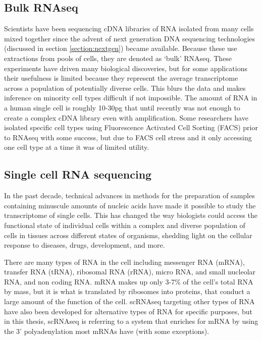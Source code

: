 \subsection{Bulk RNAseq}
\par{
Scientists have been sequencing cDNA libraries of RNA isolated from many cells mixed together since the advent of next generation DNA sequencing technologies (discussed in section \ref{section:nextgen}) became available\cite{RNAseq1}\cite{RNAseq2}. Because these use extractions from pools of cells, they are denoted as `bulk' RNAseq. These experiments have driven many biological discoveries, but for some applications their usefulness is limited because they represent the average transcriptome across a population of potentially diverse cells. This blurs the data and makes inference on minority cell types difficult if not impossible. The amount of RNA in a human single cell is roughly 10-30pg\cite{howmuchrna} that until recently was not enough to create a complex cDNA library even with amplification. Some researchers have isolated specific cell types using Fluorescence Activated Cell Sorting (FACS)\cite{FACspatent}\cite{FACs} prior to RNAseq with some success\cite{FACszebra}, but due to FACS cell stress and it only accessing one cell type at a time it was of limited utility.
}

\subsection{Single cell RNA sequencing}

\par{
In the past decade, technical advances in methods for the preparation of samples containing minuscule amounts of nucleic acids have made it possible to study the transcriptome of single cells\cite{first_singlecell}. This has changed the way biologists could access the functional state of individual cells within a complex and diverse population of cells in tissues across different states of organisms, shedding light on the cellular response to diseases, drugs, development, and more.
} 
\par{
There are many types of RNA in the cell including messenger RNA (mRNA), transfer RNA (tRNA), ribosomal RNA (rRNA), micro RNA, and small nucleolar RNA, and non coding RNA. mRNA makes up only 3-7\% of the cell's total RNA by mass\cite{rnacontent}, but it is what is translated by ribosomes into proteins, that conduct a large amount of the function of the cell. scRNAseq targeting other types of RNA have also been developed for alternative types of RNA for specific purposes\cite{nonmRNASC}, but in this thesis, scRNAseq is referring to a system that enriches for mRNA by using the 3' polyadenylation most mRNAs have (with some exceptions\cite{nonpoly}).
}

